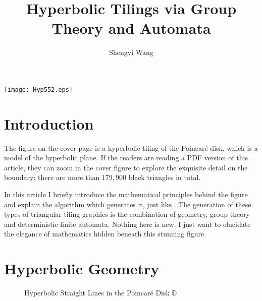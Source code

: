 \documentclass[12pt]{article}
\title{Hyperbolic Tilings via Group Theory and Automata}
\author{Shengyi Wang}
\begin{document}
\maketitle

\begin{center}
  \texttt{[image: Hyp552.eps]}
\end{center}

\section{Introduction}

The figure on the cover page is a hyperbolic tiling of the Poincar\'e
disk, which is a model of the hyperbolic plane. If the readers are
reading a PDF version of this article, they can zoom in the cover
figure to explore the exquisite detail on the boundary: there are more
than $179,900$ black triangles in total.

In this article I briefly introduce the mathematical principles behind
the figure and explain the algorithm which generates it, just like
\citep{silvio1992}. The generation of these types of triangular tiling
graphics is the combination of geometry, group theory and
deterministic finite automata. Nothing here is new. I just want to
elucidate the elegance of mathematics hidden beneath this stunning
figure.
 
\section{Hyperbolic Geometry}
\begin{figure}[htbp]
  \centering
  \caption{Hyperbolic Straight Lines in the Poincar\'e Disk $\mathbb{D}$}
  \label{fig:hyplines}
\end{figure}
\end{document}
